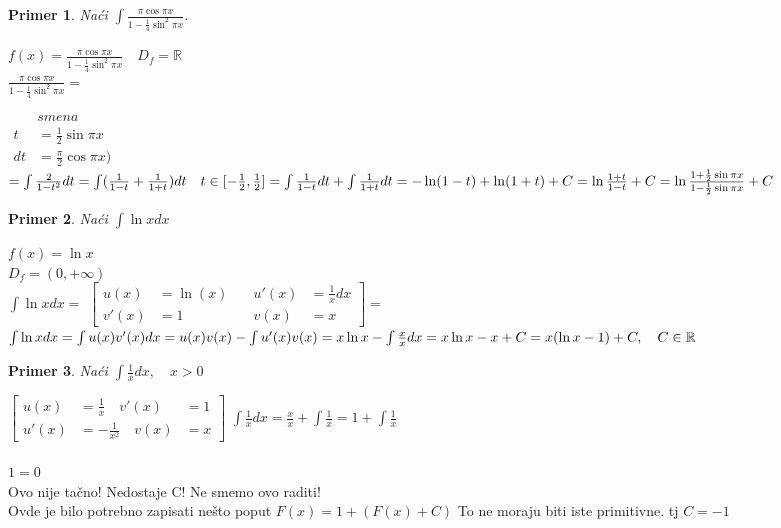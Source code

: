 \documentclass{article}
\newtheorem{prim}{Primer}[section]
\begin{document}
\begin{primbox}
    \begin{prim}
        Naći $\int\frac{\pi\cos \pi x}{1 - \frac{1}{4}\sin^2 \pi x}$.
    \end{prim}
    $f(x) = \frac{\pi \cos \pi x}{1-\frac{1}{4}\sin^2 \pi x} \quad D_f = \mathbb{R}$\\

    $\frac{\pi \cos \pi x}{1 - \frac{1}{4}\sin ^2 \pi x} =$

    $\begin{alignedat}{3}
               & smena                      \\
            t  & = \frac{1}{2}\sin \pi x    \\
            dt & = \frac{\pi}{2} \cos\pi x)
        \end{alignedat}$
    $   = \int \frac{2}{1-t^2}dt
        = \int (\frac{1}{1-t} + \frac{1}{1+t})dt\quad
        t\in[-\frac{1}{2}, \frac{1}{2}]
        = \int\frac{1}{1-t}dt + \int\frac{1}{1+t}dt \\
        = -\ln(1-t) + \ln(1+t) + C = \ln\frac{1+t}{1-t}+C
        = \ln\frac{1+\frac{1}{2}\sin \pi x}{1-\frac{1}{2}\sin\pi x} + C
    $
\end{primbox}
\begin{primbox}
    \begin{prim}
        Naći $\int \ln x dx$
    \end{prim}
    $f(x) = \ln{x}$\\
    $D_f = (0, +\infty)$\\
    $\int \ln x dx =$
    $\left [ \begin{alignedat}{2}
                u(x)  & = \ln(x) & \quad u'(x) & =  \frac{1}{x}dx \\
                v'(x) & = 1      & \quad v(x)  & = x
            \end{alignedat}
            \right ] =$
    $\int \ln x dx
        = \int u(x)v'(x) dx
        = u(x)v(x) - \int u'(x)v(x)\\\\\\
        = x\ln x - \int\frac{x}{x}dx
        = x\ln x - x + C
        = x(\ln x - 1) + C, \quad C \in \mathbb{R}$
\end{primbox}
\begin{primbox}
    \begin{prim}
        Naći $\int \frac{1}{x} dx,\quad x > 0$
    \end{prim}
    $\left [ \begin{alignedat}{2}
                u(x)  & = \frac{1}{x}\quad v'(x)   & = 1 \\
                u'(x) & = -\frac{1}{x^2}\quad v(x) & = x
            \end{alignedat} \right ]$\quad
    $\int \frac{1}{x} dx = \frac{x}{x} + \int \frac{1}{x} = 1+ \int\frac{1}{x}$\\\\
    $1 = 0$\\ Ovo nije tačno! Nedostaje C! Ne smemo ovo raditi!
    \\Ovde je bilo potrebno zapisati nešto poput $F(x) = 1 + (F(x) + C)$ To ne moraju biti iste primitivne. tj $C = -1$
\end{primbox}
\end{document}
